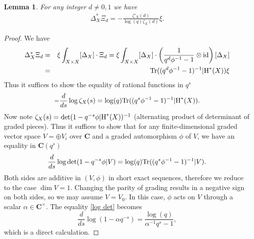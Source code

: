\documentclass[reqno]{amsart}
\numberwithin{equation}{subsection}
\newtheorem{lemma}[subsubsection]{Lemma}
\theoremstyle{definition}
\def\CC{\mathbf{C}}
\newcommand\id{\textup{id}}
\newcommand{\Tr}{\textup{Tr}}
\newcommand\op{\oplus}
\newcommand\ot{\otimes}
\newcommand{\cohog}[2]{\textup{H}^{#1}({#2})}     %
\renewcommand\a\alpha
\newcommand\D\Delta
\newcommand{\z}{\zeta}
\begin{document}
\begin{lemma}\label{l:diag Xid} 
For any integer $d\ne0,1$ we have
\begin{eqnarray*}
\D_X^*\Xi_d=-\frac{\z'_X(d)}{\log(q)\z_X(d)}\xi.
\end{eqnarray*}
\end{lemma}
\begin{proof}
We have
\begin{eqnarray*}
    \D_X^*\Xi_d&=&\xi\int_{X\times X}[\D_X]\cdot \Xi_d=\xi\int_{X\times X}[\D_X]\cdot \left(\frac{1}{q^d\phi^{-1}-1}\ot\id\right)[\D_X]\\
    &=&\Tr((q^d\phi^{-1}-1)^{-1}|\cohog{*}{X})\xi
\end{eqnarray*}
Thus it suffices to show the equality of rational functions in $q^s$
\begin{equation*}
    -\frac{d}{ds}\log\z_X(s)=\log(q)\Tr((q^s\phi^{-1}-1)^{-1}|\cohog{*}{X}).
\end{equation*}
Now note $\z_X(s)=\det(1-q^{-s}\phi|\cohog{*}{X})^{-1}$ (alternating product of determinant of graded pieces). Thus it suffices to show that for any finite-dimensional graded vector space $V=\op V_i$ over $\CC$ and a graded automorphism $\phi$ of $V$, we have an equality in $\CC(q^s)$
\begin{equation}\label{log det}
    \frac{d}{ds}\log\det(1-q^{-s}\phi|V)=\log(q)\Tr((q^s\phi^{-1}-1)^{-1}|V).
\end{equation}
Both sides are additive in $(V,\phi)$ in short exact sequences, therefore we reduce to the case $\dim V=1$. Changing the parity of grading results in a negative sign on both sides, so we may assume $V=V_0$. In this case, $\phi$ acts on $V$ through a scalar $\a\in \CC^\times$. The equality \eqref{log det} becomes
\begin{equation*}
    \frac{d}{ds}\log(1-\a q^{-s})=\frac{\log(q)}{\a^{-1}q^s-1},
\end{equation*}
which is a direct calculation.


\end{proof}
\end{document}
